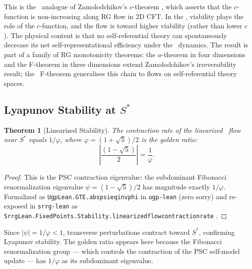 \documentclass[11pt]{article}
\newtheorem{theorem}{Theorem}[section]
\theoremstyle{remark}
\newcommand{\SRRG}{\text{SRRG}}
\newcommand{\lean}[1]{%
  \penalty-100
  \begingroup
  \def\_{\textunderscore\allowbreak}%
  \texttt{#1}%
  \endgroup
}
\newcommand{\Sstar}{S^*}
\newcommand{\goldenratio}{\varphi}
\begin{document}
This is the \SRRG\ analogue of Zamolodchikov's $c$-theorem \cite{ZamolodchikovCTheorem},
which asserts that the $c$-function is non-increasing along RG flow in 2D CFT.
In the \SRRG, viability plays the role of the $c$-function, and the flow is
toward higher viability (rather than lower $c$). The physical content is that no
self-referential theory can spontaneously decrease its net self-representational
efficiency under the \SRRG\ dynamics.
The result is part of a family of RG monotonicity theorems: the $a$-theorem
in four dimensions \cite{KomargodskiSchwimmer2011} and the F-theorem in three
dimensions \cite{KlebanovPufuSafdi2011} extend Zamolodchikov's irreversibility
result; the \SRRG\ F-theorem generalises this chain to flows on self-referential
theory spaces.

\subsection{Lyapunov Stability at $\Sstar$}
\label{sec:stability}

\begin{theorem}[Linearized Stability]
\label{thm:stability}
The contraction rate of the linearized \SRRG\ flow near $\Sstar$ equals
$1/\goldenratio$, where $\goldenratio = (1+\sqrt{5})/2$ is the golden ratio:
\begin{equation}
\left|\frac{(1-\sqrt{5})}{2}\right| = \frac{1}{\goldenratio}.
\end{equation}
\end{theorem}

\begin{proof}
This is the PSC contraction eigenvalue: the subdominant Fibonacci renormalization
eigenvalue $\psi = (1-\sqrt{5})/2$ has magnitude exactly $1/\goldenratio$.
Formalized as \lean{UgpLean.GTE.abs\_psi\_eq\_inv\_phi} in \texttt{ugp-lean}
(zero sorry) and re-exposed in \texttt{srrg-lean} as%
\newline\lean{SrrgLean.FixedPoints.Stability.linearized\_flow\_contraction\_rate}.
\end{proof}

Since $|\psi| = 1/\goldenratio < 1$, transverse perturbations contract
toward $\Sstar$, confirming Lyapunov stability. The golden ratio appears here
because the Fibonacci renormalization group --- which controls the contraction
of the PSC self-model update --- has $1/\goldenratio$ as its subdominant
eigenvalue.
\end{document}
